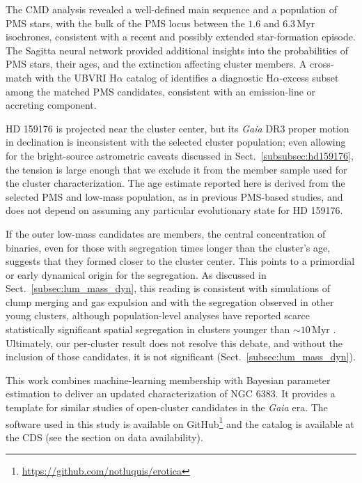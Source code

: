\documentclass{aa}
\begin{document}
The CMD analysis revealed a well-defined main sequence and a population of PMS stars, with the bulk of the PMS locus between the $1.6$ and $6.3\,\mathrm{Myr}$ isochrones, consistent with a recent and possibly extended star-formation episode. The Sagitta neural network provided additional insights into the probabilities of PMS stars, their ages, and the extinction affecting cluster members. A cross-match with the UBVRI H$\alpha$ catalog of \citet{2010AA...511A..25R} identifies a diagnostic H$\alpha$-excess subset among the matched PMS candidates, consistent with an emission-line or accreting component.

HD 159176 is projected near the cluster center, but its \textit{Gaia} DR3 proper motion in declination is inconsistent with the selected cluster population; even allowing for the bright-source astrometric caveats discussed in Sect.~\ref{subsubsec:hd159176}, the tension is large enough that we exclude it from the member sample used for the cluster characterization. The age estimate reported here is derived from the selected PMS and low-mass population, as in previous PMS-based studies, and does not depend on assuming any particular evolutionary state for HD 159176.

If the outer low-mass candidates are members, the central concentration of binaries, even for those with segregation times longer than the cluster's age, suggests that they formed closer to the cluster center. This points to a primordial or early dynamical origin for the segregation. As discussed in Sect.~\ref{subsec:lum_mass_dyn}, this reading is consistent with simulations of clump merging and gas expulsion and with the segregation observed in other young clusters, although population-level analyses have reported scarce statistically significant spatial segregation in clusters younger than $\sim10\,\mathrm{Myr}$ \citep{2026AJ....171..236Z}. Ultimately, our per-cluster result does not resolve this debate, and without the inclusion of those candidates, it is not significant (Sect.~\ref{subsec:lum_mass_dyn}).

This work combines machine-learning membership with Bayesian parameter estimation to deliver an updated characterization of NGC 6383. It provides a template for similar studies of open-cluster candidates in the \textit{Gaia} era. The software used in this study is available on GitHub\footnote{\href{https://github.com/notluquis/erotica}{https://github.com/notluquis/erotica}} and the catalog is available at the CDS (see the section on data availability).
\end{document}
